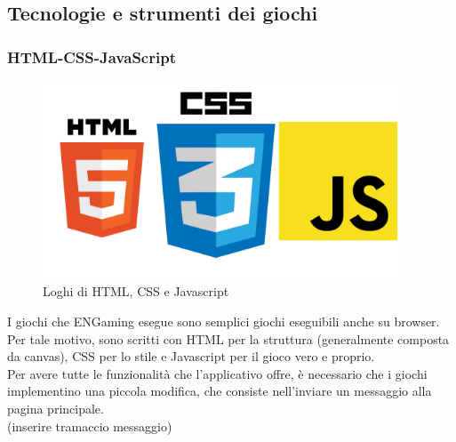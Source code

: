 \subsection{Tecnologie e strumenti dei giochi}

\subsubsection{HTML-CSS-JavaScript}
\begin{figure}[h]
    \centering
    \includegraphics[width=300pt]{images/technologies/HTMLCSSJS.png}
    \caption{Loghi di HTML, CSS e Javascript}
    \label{fig:HTMLCSSJS}
\end{figure}
I giochi che ENGaming esegue sono semplici giochi eseguibili anche su browser. Per tale motivo, sono scritti con HTML per la struttura (generalmente composta da canvas), CSS per lo stile e Javascript per il gioco vero e proprio.\\
Per avere tutte le funzionalità che l'applicativo offre, è necessario che i giochi implementino una piccola modifica, che consiste nell'inviare un messaggio alla pagina principale.\\
(inserire tramaccio messaggio)

